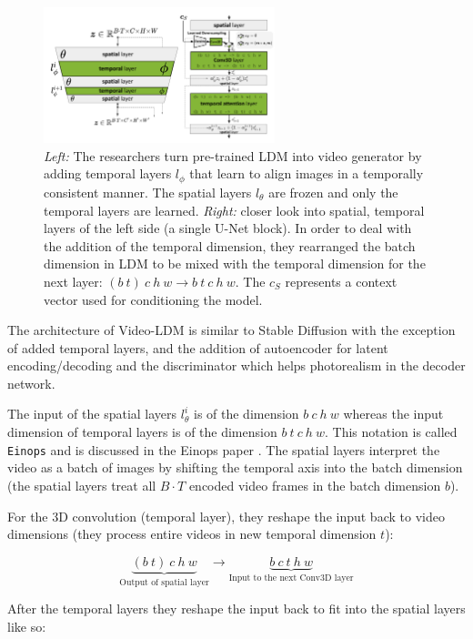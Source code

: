 \begin{figure}
    \centering
    \includegraphics[width=0.6\textwidth]{images/video_ldm/temporal_layers.png}
    \caption{\textit{Left:} The researchers turn pre-trained LDM into video generator by adding temporal layers $l_\phi$ that learn to align images in a temporally consistent manner. The spatial layers $l_\theta$ are frozen and only the temporal layers are learned. \textit{Right:} closer look into spatial, temporal layers of the left side (a single U-Net block). In order to deal with the addition of the temporal dimension, they rearranged the batch dimension in LDM to be mixed with the temporal dimension for the next layer: $(b\ t)\ c\ h\ w \rightarrow b\ t\ c\ h\ w$. The $c_S$ represents a context vector used for conditioning the model.}
    \label{fig:video_ldm_spatial_temporal_mixing_layers}
\end{figure}

The architecture of Video-LDM is similar to Stable Diffusion with the exception of added temporal layers, and the addition of autoencoder for latent encoding/decoding and the discriminator which helps photorealism in the decoder network.

The input of the spatial layers $l_\theta^i$ is of the dimension $b\ c\ h\ w$ whereas the input dimension of temporal layers is of the dimension $b\ t\ c\ h\ w$. This notation is called \texttt{Einops} and is discussed in the Einops paper \cite{einops}. The spatial layers interpret the video as a batch of images by shifting the temporal axis into the batch dimension (the spatial layers treat all $B \cdot T$ encoded video frames in the batch dimension $b$). 

For the 3D convolution (temporal layer), they reshape the input back to video dimensions (they process entire videos in new temporal dimension $t$): 

\[ \underbrace{(b\ t)\ c\ h\ w}_{\text{Output of spatial layer}} \rightarrow \underbrace{b\ c\ t\ h\ w}_{\text{Input to the next Conv3D layer}} \]

After the temporal layers they reshape the input back to fit into the spatial layers like so:

